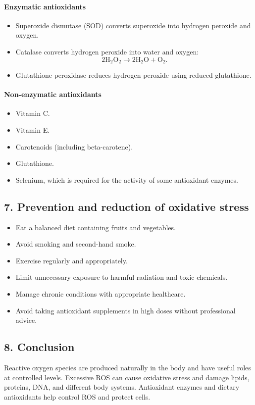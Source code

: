 \documentclass[11pt]{article}
\begin{document}
\paragraph{Enzymatic antioxidants}
\begin{itemize}
    \item Superoxide dismutase (SOD) converts superoxide into hydrogen peroxide and oxygen.
    \item Catalase converts hydrogen peroxide into water and oxygen:
    \[
    \mathrm{2H_2O_2\longrightarrow 2H_2O+O_2}.
    \]
    \item Glutathione peroxidase reduces hydrogen peroxide using reduced glutathione.
\end{itemize}

\paragraph{Non-enzymatic antioxidants}
\begin{itemize}
    \item Vitamin C.
    \item Vitamin E.
    \item Carotenoids (including beta-carotene).
    \item Glutathione.
    \item Selenium, which is required for the activity of some antioxidant enzymes.
\end{itemize}

\subsection*{7. Prevention and reduction of oxidative stress}
\begin{itemize}
    \item Eat a balanced diet containing fruits and vegetables.
    \item Avoid smoking and second-hand smoke.
    \item Exercise regularly and appropriately.
    \item Limit unnecessary exposure to harmful radiation and toxic chemicals.
    \item Manage chronic conditions with appropriate healthcare.
    \item Avoid taking antioxidant supplements in high doses without professional advice.
\end{itemize}

\subsection*{8. Conclusion}
Reactive oxygen species are produced naturally in the body and have useful roles at controlled levels. Excessive ROS can cause oxidative stress and damage lipids, proteins, DNA, and different body systems. Antioxidant enzymes and dietary antioxidants help control ROS and protect cells.
\end{document}
